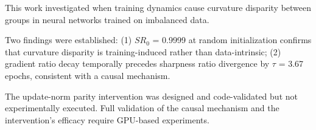 
This work investigated when training dynamics cause curvature disparity between groups in neural networks trained on imbalanced data.

Two findings were established: (1) $SR_0$ = 0.9999 at random initialization confirms that curvature disparity is training-induced rather than data-intrinsic; (2) gradient ratio decay temporally precedes sharpness ratio divergence by $\tau$ = 3.67 epochs, consistent with a causal mechanism.

The update-norm parity intervention was designed and code-validated but not experimentally executed. Full validation of the causal mechanism and the intervention's efficacy require GPU-based experiments.

